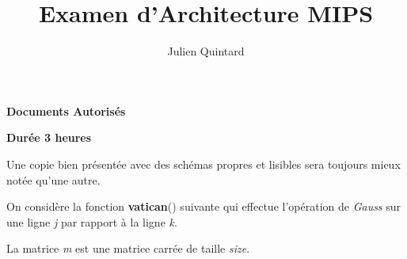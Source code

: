 %
%
%
%
%
%

%
%

%
%

\def\path{../../../..}

%
%



%
%


%
%

\title{Examen d'Architecture MIPS}

%
%

\author{\small{Julien Quintard}}

%
%



%
%

\maketitle

%
%

\indentation{}

%
%

\begin{center}

\textbf{Documents Autoris\'es}

\textbf{Dur\'ee 3 heures}

\scriptsize{Une copie bien pr\'esent\'ee avec des sch\'emas propres et
	    lisibles sera toujours mieux not\'ee qu'une autre.}
\end{center}

%
%

On consid\`ere la fonction \textbf{vatican}() suivante qui effectue
l'op\'eration de \textit{Gauss} sur une ligne \textit{j} par rapport \`a
la ligne \textit{k}.

La matrice \textit{m} est une matrice carr\'ee de taille \textit{size}.

